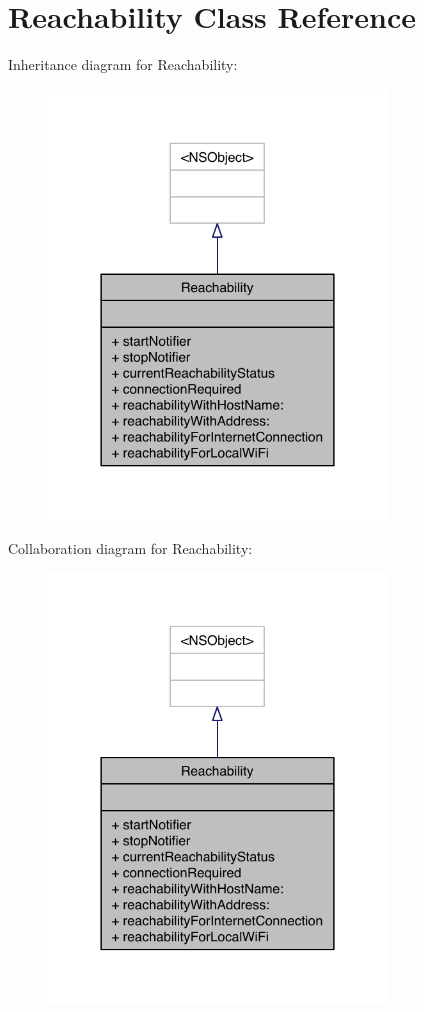 \hypertarget{interface_reachability}{\section{Reachability Class Reference}
\label{interface_reachability}
}


Inheritance diagram for Reachability\-:
\nopagebreak
\begin{figure}[H]
\begin{center}
\leavevmode
\includegraphics[width=254pt]{interface_reachability__inherit__graph}
\end{center}
\end{figure}


Collaboration diagram for Reachability\-:
\nopagebreak
\begin{figure}[H]
\begin{center}
\leavevmode
\includegraphics[width=254pt]{interface_reachability__coll__graph}
\end{center}
\end{figure}
